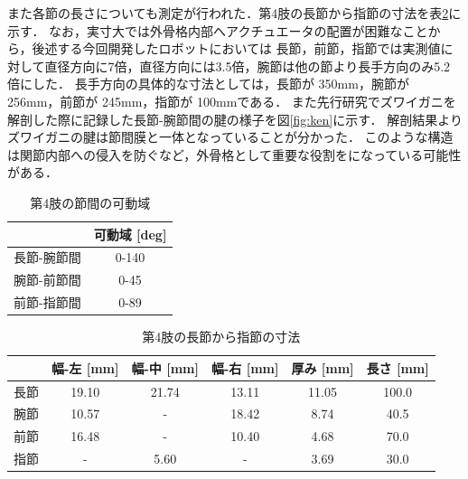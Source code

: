また各節の長さについても測定が行われた．第4肢の長節から指節の寸法を表\ref{tab:4setu}に示す．
なお，実寸大では外骨格内部へアクチュエータの配置が困難なことから，後述する今回開発したロボットにおいては
長節，前節，指節では実測値に対して直径方向に7倍，直径方向には3.5倍，腕節は他の節より長手方向のみ5.2倍にした．
長手方向の具体的な寸法としては，長節が 350mm，腕節が 256mm，前節が 245mm，指節が 100mmである．
また先行研究\cite{hasegawa}でズワイガニを解剖した際に記録した長節-腕節間の腱の様子を図\ref{fig:ken}に示す．
解剖結果よりズワイガニの腱は節間膜と一体となっていることが分かった\cite{hasegawa}．
このような構造は関節内部への侵入を防ぐなど，外骨格として重要な役割をになっている可能性がある．
\begin{table}[htbp]
  \centering
  \vspace{5mm}
  \caption{第4肢の節間の可動域}
  \label{tab:4setukadou}
  \vspace{-3mm}
  \begin{tabular}{|l|c|}
  \hline
         & \multicolumn{1}{l|}{可動域 {[}deg{]}} \\ \hline
  長節-腕節間 & 0-140                            \\ \hline
  腕節-前節間 & 0-45                             \\ \hline
  前節-指節間 & 0-89                            \\ \hline
  \end{tabular}
\end{table}
\begin{table}[htbp]
  \centering
  \caption{第4肢の長節から指節の寸法}
  \label{tab:4setu}
  \vspace{-3mm}
  \begin{tabular}{|l|c|c|c|c|c|}
  \hline
     & \multicolumn{1}{l|}{幅-左 [mm]} & \multicolumn{1}{l|}{幅-中 [mm]} & \multicolumn{1}{l|}{幅-右 [mm]} & \multicolumn{1}{l|}{厚み [mm]} & \multicolumn{1}{l|}{長さ [mm]} \\ \hline
  長節 & 19.10                       & 21.74                       & 13.11                       & 11.05                       & 100.0                       \\ \hline
  腕節 & 10.57                       & -                           & 18.42                       & 8.74                        & 40.5                        \\ \hline
  前節 & 16.48                       & -                           & 10.40                       & 4.68                        & 70.0                        \\ \hline
  指節 & -                           & 5.60                        & -                           & 3.69                        & 30.0                        \\ \hline
  \end{tabular}
\end{table}
